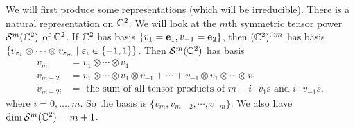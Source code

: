 \begin{exam}[$SU_2$]
  We will first produce some representations (which will be irreducible).
  There is a natural representation on $\mathbb{C}^2$.
  We will look at the $m$th symmetric tensor power $\mathcal{S}^m(\mathbb{C}^2)$ of $\mathbb{C}^2$.
  If $\mathbb{C}^2$ has basis $\{v_1=\mathbf{e}_1,v_{-1}=\mathbf{e}_2\}$, then $(\mathbb{C}^2)^{\oplus m}$ has basis $\{v_{\varepsilon_1} \otimes \cdots \otimes v_{\varepsilon_m} \mid \varepsilon_i \in \{-1,1\} \}$.
  Then $\mathcal{S}^m(\mathbb{C}^2)$ has basis
  \begin{align*}
    v_m &= v_1 \otimes \cdots \otimes v_1 \\
    v_{m-2} &= v_1 \otimes \cdots \otimes v_1 \otimes v_{-1} + \cdots + v_{-1} \otimes v_1 \otimes \cdots \otimes v_1 \\
    v_{m-2i} &= \text{ the sum of all tensor products of $m-i$ $v_1$s and $i$ $v_{-1}s$.}
  \end{align*}
  where $i=0,\ldots,m$.
  So the basis is $\{ v_m ,v_{m-2}, \cdots, v_{-m}\}$.
  We also have $\dim\mathcal{S}^m(\mathbb{C}^2)=m+1$.


\end{exam}
